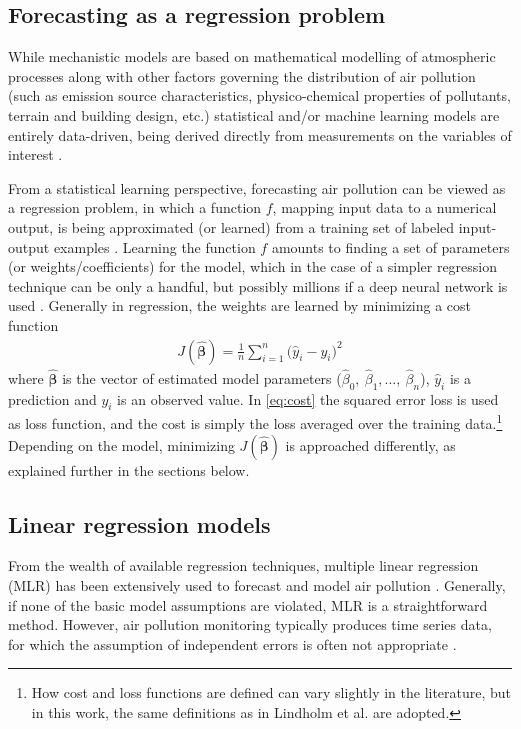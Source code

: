 \subsection{Forecasting as a regression problem}
\label{sec:forecasting}
While mechanistic models are based on mathematical modelling of atmospheric processes along with other factors governing the distribution of air pollution (such as emission source characteristics, physico-chemical properties of pollutants, terrain and building design, etc.) statistical and/or machine learning models are entirely data-driven, being derived directly from measurements on the variables of interest \cite{ElHarbawi2013}. 

From a statistical learning perspective, forecasting air pollution can be viewed as a regression problem, in which a function $f$, mapping input data to a numerical output, is being approximated (or learned) from a training set of labeled input-output examples \cite{smlbook}. Learning the function $f$ amounts to finding a set of parameters (or weights/coefficients) for the model, which in the case of a simpler regression technique can be only a handful, but possibly millions if a deep neural network is used \cite{smlbook}. Generally in regression, the weights are learned by minimizing a cost function
\begin{align}
J(\bm{\hat{\beta}}) = \frac{1}{n} \sum_{i=1}^{n} \big(\hat{y}_i - y_i \big)^2
\label{eq:cost}
\end{align}
where $\bm{\hat{\beta}}$ is the vector of estimated model parameters ($\hat{\beta}_0, \: \hat{\beta}_1, ..., \: \hat{\beta}_n$), $\hat{y}_i$ is a prediction and $y_i$ is an observed value\cite{smlbook}. In \cref{eq:cost} the squared error loss is used as loss function, and the cost is simply the loss averaged over the training data.\footnote{How cost and loss functions are defined can vary slightly in the literature, but in this work, the same definitions as in Lindholm et al. \cite{smlbook} are adopted.} Depending on the model, minimizing $J(\bm{\hat{\beta}})$ is approached differently, as explained further in the sections below. 

\subsection{Linear regression models}

From the wealth of available regression techniques, multiple linear regression (MLR) has been extensively used to forecast and model air pollution \cite{atmos7020015}. Generally, if none of the basic model assumptions are violated, MLR is a straightforward method. 
However, air pollution monitoring typically produces time series data, for which the assumption of independent errors is often not appropriate \cite{Montgomery2012}.

